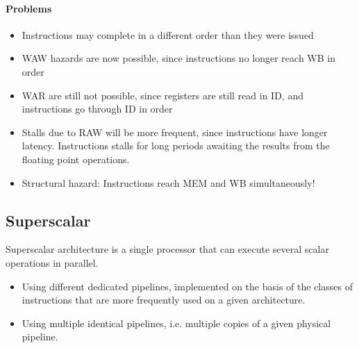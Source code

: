 \paragraph{Problems}
\begin{itemize}
    \item Instructions may complete in a different order than they were issued
    \item WAW hazards are now possible, since instructions no longer reach WB in order
    \item WAR are still not possible, since registers are still read in ID, and instructions go through ID in order
    \item Stalls due to RAW will be more frequent, since instructions have longer latency. Instructions stalls for long periods awaiting the results from the floating point operations.
    \item Structural hazard: Instructions reach MEM and WB simultaneously!
\end{itemize}

\subsection{Superscalar}
Superscalar architecture is a single processor that can execute several scalar operations in parallel.
\begin{itemize}
    \item Using different dedicated pipelines, implemented on the basis of the classes of instructions that are more frequently used on a given architecture.
    \item Using multiple identical pipelines, i.e. multiple copies of a given physical pipeline.
\end{itemize}
